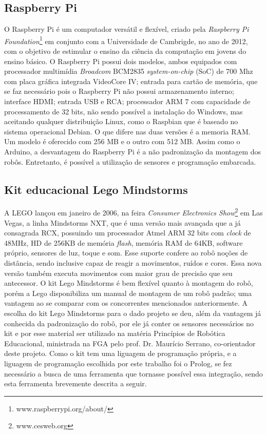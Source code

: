 \subsection{Raspberry Pi}
O Raspberry Pi é um computador versátil e flexível, criado pela \textit{Raspberry Pi Foundation}\footnote{www.raspberrypi.org/about/} em conjunto com a Universidade de Cambrigde, no ano de 2012, com o objetivo de estimular o ensino da ciência da computação em jovens do ensino básico.
O Raspberry Pi possui dois modelos, ambos equipados com processador multimídia \textit{Broadcom} BCM2835 \textit{system-on-chip} (SoC) de 700 Mhz com placa gráfica integrada VideoCore IV; entrada para cartão de memória, que se faz necessário pois o Raspberry Pi não possui armazenamento interno; interface HDMI; entrada USB e RCA; processador ARM 7 com capacidade de processamento de 32 bits, não sendo possível a instalação do Windows, mas aceitando qualquer distribuição Linux, como o Raspbian que é baseado no sistema operacional Debian. O que difere nas duas versões é a memoria RAM. Um modelo é oferecido com 256 MB e o outro com 512 MB.
Assim como o Arduino, a desvantagem do Raspberry Pi é a não padronização da montagem dos robôs. Entretanto, é possível a utilização de sensores e programação embarcada.

\subsection{Kit educacional Lego Mindstorms}
A LEGO lançou em janeiro de 2006, na feira \textit{Consumer Electronics Show}\footnote{www.cesweb.org} em Las Vegas, a linha Mindstorms NXT, que é uma versão mais avançada que a já consagrada RCX, possuindo um processador Atmel ARM 32 bits com \textit{clock} de 48MHz, HD de 256KB de memória \textit{flash}, memória RAM de 64KB, software próprio, sensores de luz, toque e som. Esse suporte confere ao robô noções de distância, sendo inclusive capaz de reagir a movimentos, ruídos e cores. Essa nova versão também executa movimentos com maior grau de precisão que seu antecessor.
O kit Lego Mindstorms é bem flexível quanto à montagem do robô, porém a Lego disponibiliza um manual de montagem de um robô padrão; uma vantagem ao se comparar com os concorrentes mencionados anteriormente. 
A escolha do kit Lego Mindstorms para o dado projeto se deu, além da vantagem já conhecida da padronização do robô, por ele já conter os sensores necessários no kit e por esse material ser utilizado na matéria Princípios de Robótica Educacional, ministrada na FGA pelo prof. Dr. Maurício Serrano, co-orientador deste projeto. Como o kit tem uma liguagem de programação própria, e a liguagem de programação escolhida por este trabalho foi o Prolog, se fez necessário a busca de uma ferramenta que tornasse possível essa integração, sendo esta ferramenta brevemente descrita a seguir.  

